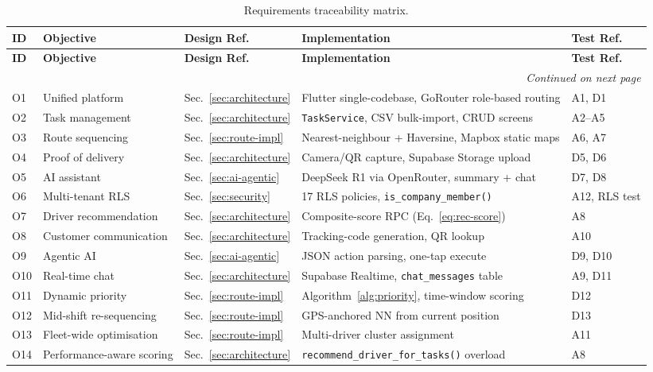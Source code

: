 \begin{small}
\begin{longtable}{@{}p{0.7cm}p{2.6cm}p{2.6cm}p{3.8cm}p{1.8cm}@{}}
\caption{Requirements traceability matrix.}
\label{tab:req-trace}\\
\toprule
\textbf{ID} & \textbf{Objective} & \textbf{Design Ref.} & \textbf{Implementation} & \textbf{Test Ref.}\\
\midrule
\endfirsthead
\toprule
\textbf{ID} & \textbf{Objective} & \textbf{Design Ref.} & \textbf{Implementation} & \textbf{Test Ref.}\\
\midrule
\endhead
\midrule \multicolumn{5}{r}{\textit{Continued on next page}}\\
\endfoot
\bottomrule
\endlastfoot

O1 & Unified platform & Sec.~\ref{sec:architecture} & Flutter single-codebase, GoRouter role-based routing & A1, D1 \\
O2 & Task management & Sec.~\ref{sec:architecture} & \texttt{TaskService}, CSV bulk-import, CRUD screens & A2--A5 \\
O3 & Route sequencing & Sec.~\ref{sec:route-impl} & Nearest-neighbour + Haversine, Mapbox static maps & A6, A7 \\
O4 & Proof of delivery & Sec.~\ref{sec:architecture} & Camera/QR capture, Supabase Storage upload & D5, D6 \\
O5 & AI assistant & Sec.~\ref{sec:ai-agentic} & DeepSeek R1 via OpenRouter, summary + chat & D7, D8 \\
O6 & Multi-tenant RLS & Sec.~\ref{sec:security} & 17 RLS policies, \texttt{is\_company\_member()} & A12, RLS test \\
O7 & Driver recommendation & Sec.~\ref{sec:architecture} & Composite-score RPC (Eq.~\ref{eq:rec-score}) & A8 \\
O8 & Customer communication & Sec.~\ref{sec:architecture} & Tracking-code generation, QR lookup & A10 \\
O9 & Agentic AI & Sec.~\ref{sec:ai-agentic} & JSON action parsing, one-tap execute & D9, D10 \\
O10 & Real-time chat & Sec.~\ref{sec:architecture} & Supabase Realtime, \texttt{chat\_messages} table & A9, D11 \\
O11 & Dynamic priority & Sec.~\ref{sec:route-impl} & Algorithm~\ref{alg:priority}, time-window scoring & D12 \\
O12 & Mid-shift re-sequencing & Sec.~\ref{sec:route-impl} & GPS-anchored NN from current position & D13 \\
O13 & Fleet-wide optimisation & Sec.~\ref{sec:route-impl} & Multi-driver cluster assignment & A11 \\
O14 & Performance-aware scoring & Sec.~\ref{sec:architecture} & \texttt{recommend\_driver\_for\_tasks()} overload & A8 \\
\end{longtable}
\end{small}

